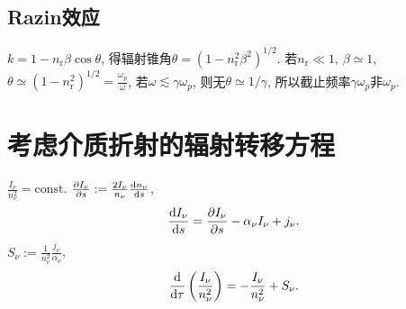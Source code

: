 \subsection{Razin效应}

$k=1-n_\text{r}\beta\cos\theta$, 得辐射锥角$\theta=(1-n_\text{r}^2\beta^2)^{1/2}$. 若$n_\text{r}\ll1$, $\beta\simeq1$, $\theta\simeq(1-n_\text{r}^2)^{1/2}=\frac{\omega_p}{\omega}$, 若$\omega\lesssim\gamma\omega_p$, 则无$\theta\simeq1/\gamma$, 所以截止频率$\gamma\omega_p$非$\omega_p$.

\section{考虑介质折射的辐射转移方程}

$\frac{I_\nu}{n_\nu^2}=\text{const}$. $\frac{\partial I_\nu}{\partial s}:=\frac{2I_\nu}{n_\nu}\frac{\mathrm{d} n_\nu}{\mathrm{d} s}$,
\begin{equation}
    \frac{\mathrm{d} I_\nu}{\mathrm{d} s}=\frac{\partial I_\nu}{\partial s}-\alpha_\nu I_\nu+j_\nu.
\end{equation}
$S_\nu:=\frac{1}{n_\nu^2}\frac{j_\nu}{\alpha_\nu}$,
\begin{equation}
    \frac{\mathrm{d} }{\mathrm{d} \tau}\left(\frac{I_\nu}{n_\nu^2}\right)=-\frac{I_\nu}{n_\nu^2}+S_\nu.
\end{equation}
